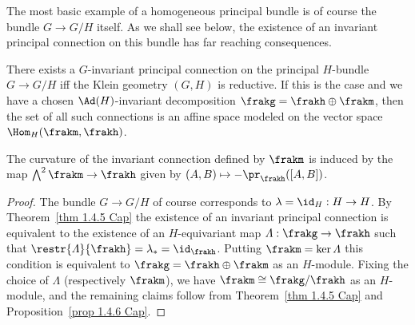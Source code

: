 The most basic example of a homogeneous principal bundle is of course the bundle $G\to G\slash H$ itself. As we shall see below, the existence of an invariant principal connection on this bundle has far reaching consequences.

\begin{cor}\label{cor 1.4.6 Cap}
    There exists a $G$-invariant principal connection on the principal $H$-bundle $G\to G\slash H$ iff the Klein geometry $(G,H)$ is reductive. If this is the case and we have a chosen $\Ad(H)$-invariant decomposition $\frakg=\frakh\oplus\frakm$, then the set of all such connections is an affine space modeled on the vector space $\Hom_H(\frakm,\frakh)$.

    The curvature of the invariant connection defined by $\frakm$ is induced by the map $\bigwedge^2\frakm\to\frakh$ given by $(A,B)\mapsto -\pr_\frakh([A,B])$.
\end{cor}
\begin{proof}
    The bundle $G\to G\slash H$ of course corresponds to $\lambda=\id_H:H\to H$. By Theorem~\ref{thm 1.4.5 Cap} the existence of an invariant principal connection is equivalent to the existence of an $H$-equivariant map $\varLambda:\frakg\to\frakh$ such that $\restr{\varLambda}{\frakh}=\lambda_\ast=\id_\frakh$. Putting $\frakm=\ker\varLambda$ this condition is equivalent to $\frakg=\frakh\oplus \frakm$ as an $H$-module. Fixing the choice of $\varLambda$ (respectively $\frakm$), we have $\frakm\cong \frakg\slash\frakh$ as an $H$-module, and the remaining claims follow from Theorem~\ref{thm 1.4.5 Cap} and Proposition~\ref{prop 1.4.6 Cap}.
\end{proof}


